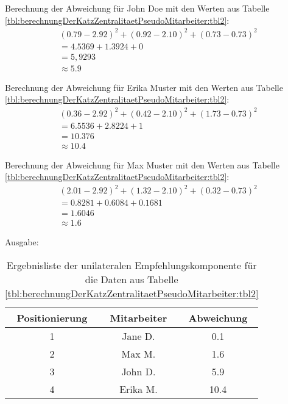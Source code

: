 Berechnung der Abweichung für John Doe mit den Werten aus Tabelle \ref{tbl:berechnungDerKatzZentralitaetPseudoMitarbeiter:tbl2}:
\begin{gather}
	\nonumber (0.79-2.92)^2 + (0.92-2.10)^2 + (0.73-0.73)^2\\
	\nonumber = 4.5369 + 1.3924 + 0\\
	\nonumber = 5,9293\\
	\approx 5.9
	\label{frml:nebenrechnungen:unilateral:john}
\end{gather}

Berechnung der Abweichung für Erika Muster mit den Werten aus Tabelle \ref{tbl:berechnungDerKatzZentralitaetPseudoMitarbeiter:tbl2}:
\begin{gather}
	\nonumber (0.36-2.92)^2 + (0.42-2.10)^2 + (1.73-0.73)^2\\
	\nonumber = 6.5536 + 2.8224 + 1\\
	\nonumber = 10.376\\
	\approx 10.4
	\label{frml:nebenrechnungen:unilateral:erika}
\end{gather}

Berechnung der Abweichung für Max Muster mit den Werten aus Tabelle \ref{tbl:berechnungDerKatzZentralitaetPseudoMitarbeiter:tbl2}:
\begin{gather}
	\nonumber (2.01-2.92)^2 + (1.32-2.10)^2 + (0.32-0.73)^2\\
	\nonumber = 0.8281 + 0.6084 + 0.1681\\
	\nonumber = 1.6046\\
	\approx 1.6
	\label{frml:nebenrechnungen:unilateral:max}
\end{gather}

Ausgabe:
\begin{table}[h]
	\centering
	\begin{tabular}{c|c|c}
		Positionierung & Mitarbeiter & Abweichung\\
		\hline
		1 & Jane D.  & 0.1\\
		2 & Max M.   & 1.6\\
		3 & John D.  & 5.9\\
		4 & Erika M. & 10.4
	\end{tabular}
	\caption{Ergebnisliste der unilateralen Empfehlungskomponente für die Daten aus Tabelle \ref{tbl:berechnungDerKatzZentralitaetPseudoMitarbeiter:tbl2}}
	\label{tbl:nebenrechnungen:unilateral:ausgabe}
\end{table}